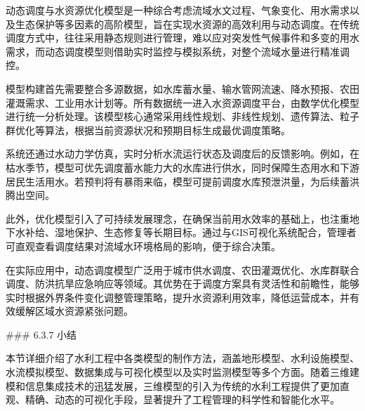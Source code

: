 动态调度与水资源优化模型是一种综合考虑流域水文过程、气象变化、用水需求以及生态保护等多因素的高阶模型，旨在实现水资源的高效利用与动态调度。在传统调度方式中，往往采用静态规则进行管理，难以应对突发性气候事件和多变的用水需求，而动态调度模型则借助实时监控与模拟系统，对整个流域水量进行精准调控。

模型构建首先需要整合多源数据，如水库蓄水量、输水管网流速、降水预报、农田灌溉需求、工业用水计划等。所有数据统一进入水资源调度平台，由数学优化模型进行统一分析处理。该模型核心通常采用线性规划、非线性规划、遗传算法、粒子群优化等算法，根据当前资源状况和预期目标生成最优调度策略。

系统还通过水动力学仿真，实时分析水流运行状态及调度后的反馈影响。例如，在枯水季节，模型可优先调度蓄水能力大的水库进行供水，同时保障生态用水和下游居民生活用水。若预判将有暴雨来临，模型可提前调度水库预泄洪量，为后续蓄洪腾出空间。

此外，优化模型引入了可持续发展理念，在确保当前用水效率的基础上，也注重地下水补给、湿地保护、生态修复等长期目标。通过与GIS可视化系统配合，管理者可直观查看调度结果对流域水环境格局的影响，便于综合决策。

在实际应用中，动态调度模型广泛用于城市供水调度、农田灌溉优化、水库群联合调度、防洪抗旱应急响应等领域。其优势在于调度方案具有灵活性和前瞻性，能够实时根据外界条件变化调整管理策略，提升水资源利用效率，降低运营成本，并有效缓解区域水资源紧张问题。

\#\#\# 6.3.7 小结

本节详细介绍了水利工程中各类模型的制作方法，涵盖地形模型、水利设施模型、水流模拟模型、数据集成与可视化模型以及实时监测模型等多个方面。随着三维建模和信息集成技术的迅猛发展，三维模型的引入为传统的水利工程提供了更加直观、精确、动态的可视化手段，显著提升了工程管理的科学性和智能化水平。

